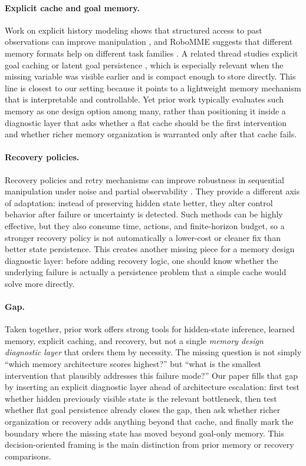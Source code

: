 \paragraph{Explicit cache and goal memory.}
Work on explicit history modeling shows that structured access to past observations can improve manipulation \citep{Guhur2022}, and RoboMME suggests that different memory formats help on different task families \citep{Dai2026}. A related thread studies explicit goal caching or latent goal persistence \citep{Yarats2022, Lynch2020}, which is especially relevant when the missing variable was visible earlier and is compact enough to store directly. This line is closest to our setting because it points to a lightweight memory mechanism that is interpretable and controllable. Yet prior work typically evaluates such memory as one design option among many, rather than positioning it inside a diagnostic layer that asks whether a flat cache should be the first intervention and whether richer memory organization is warranted only after that cache fails.

\paragraph{Recovery policies.}
Recovery policies and retry mechanisms can improve robustness in sequential manipulation under noise and partial observability \citep{Vats2024, Vats2023}. They provide a different axis of adaptation: instead of preserving hidden state better, they alter control behavior after failure or uncertainty is detected. Such methods can be highly effective, but they also consume time, actions, and finite-horizon budget, so a stronger recovery policy is not automatically a lower-cost or cleaner fix than better state persistence. This creates another missing piece for a memory design diagnostic layer: before adding recovery logic, one should know whether the underlying failure is actually a persistence problem that a simple cache would solve more directly.

\paragraph{Gap.}
Taken together, prior work offers strong tools for hidden-state inference, learned memory, explicit caching, and recovery, but not a single \emph{memory design diagnostic layer} that orders them by necessity. The missing question is not simply ``which memory architecture scores highest?'' but ``what is the smallest intervention that plausibly addresses this failure mode?'' Our paper fills that gap by inserting an explicit diagnostic layer ahead of architecture escalation: first test whether hidden previously visible state is the relevant bottleneck, then test whether flat goal persistence already closes the gap, then ask whether richer organization or recovery adds anything beyond that cache, and finally mark the boundary where the missing state has moved beyond goal-only memory. This decision-oriented framing is the main distinction from prior memory or recovery comparisons.
